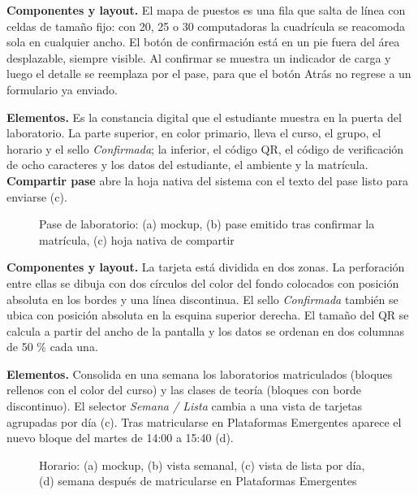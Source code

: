 \textbf{Componentes y layout.} El mapa de puestos es una fila que salta de línea con celdas de tamaño fijo: con 20, 25 o 30 computadoras la cuadrícula se reacomoda sola en cualquier ancho. El botón de confirmación está en un pie fuera del área desplazable, siempre visible. Al confirmar se muestra un indicador de carga y luego el detalle se reemplaza por el pase, para que el botón Atrás no regrese a un formulario ya enviado.


\textbf{Elementos.} Es la constancia digital que el estudiante muestra en la puerta del laboratorio. La parte superior, en color primario, lleva el curso, el grupo, el horario y el sello \textit{Confirmada}; la inferior, el código QR, el código de verificación de ocho caracteres y los datos del estudiante, el ambiente y la matrícula. \textbf{Compartir pase} abre la hoja nativa del sistema con el texto del pase listo para enviarse (c).

\begin{figure}[!htbp]
\centering
{}
\caption{Pase de laboratorio: (a) mockup, (b) pase emitido tras confirmar la matrícula, (c) hoja nativa de compartir}
\label{fig:i05}
\end{figure}

\textbf{Componentes y layout.} La tarjeta está dividida en dos zonas. La perforación entre ellas se dibuja con dos círculos del color del fondo colocados con posición absoluta en los bordes y una línea discontinua. El sello \textit{Confirmada} también se ubica con posición absoluta en la esquina superior derecha. El tamaño del QR se calcula a partir del ancho de la pantalla y los datos se ordenan en dos columnas de 50 \% cada una.


\textbf{Elementos.} Consolida en una semana los laboratorios matriculados (bloques rellenos con el color del curso) y las clases de teoría (bloques con borde discontinuo). El selector \textit{Semana / Lista} cambia a una vista de tarjetas agrupadas por día (c). Tras matricularse en Plataformas Emergentes aparece el nuevo bloque del martes de 14:00 a 15:40 (d).

\begin{figure}[!htbp]
\centering
{}
\caption{Horario: (a) mockup, (b) vista semanal, (c) vista de lista por día, (d) semana después de matricularse en Plataformas Emergentes}
\label{fig:i06}
\end{figure}

